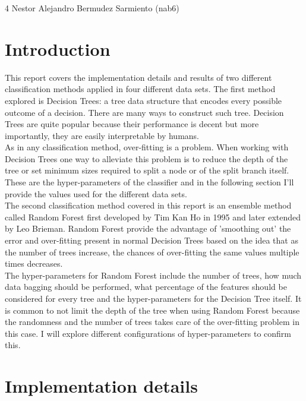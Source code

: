 \documentclass[11pt]{article}
\begin{document}
\homework
    {4}
    {Nestor Alejandro Bermudez Sarmiento (nab6)}
    {}


\section*{Introduction}

This report covers the implementation details and results of two different classification methods applied in four different data sets. The first method explored is Decision Trees: a tree data structure that encodes every possible outcome of a decision. There are many ways to construct such tree. Decision Trees are quite popular because their performance is decent but more importantly, they are easily interpretable by humans.\\

As in any classification method, over-fitting is a problem. When working with Decision Trees one way to alleviate this problem is to reduce the depth of the tree or set minimum sizes required to split a node or of the split branch itself. These are the hyper-parameters of the classifier and in the following section I'll provide the values used for the different data sets.\\

The second classification method covered in this report is an ensemble method called Random Forest first developed by Tim Kan Ho in 1995 and later extended by Leo Brieman. Random Forest provide the advantage of 'smoothing out' the error and over-fitting present in normal Decision Trees based on the idea that as the number of trees increase, the chances of over-fitting the same values multiple times decreases. \\

The hyper-parameters for Random Forest include the number of trees, how much data bagging should be performed, what percentage of the features should be considered for every tree and the hyper-parameters for the Decision Tree itself. It is common to not limit the depth of the tree when using Random Forest because the randomness and the number of trees takes care of the over-fitting problem in this case. I will explore different configurations of hyper-parameters to confirm this.

\section*{Implementation details}
\end{document}
